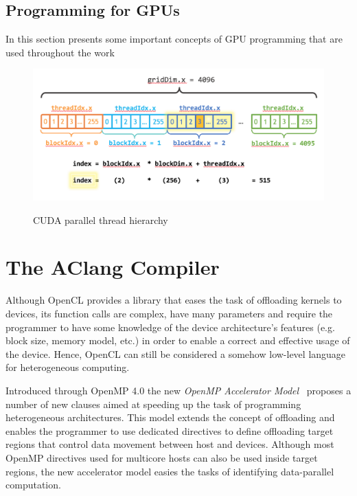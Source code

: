 \documentclass[Ingles]{ic-tese-v1}
\newcommand{\tit}[1]{{\textit{#1}}}
\begin{document}
\subsection{Programming for GPUs}

In this section presents some important concepts of GPU programming
that are used throughout the work 

\begin{figure}[t]
	\caption{CUDA parallel thread hierarchy}
	\centering
	\includegraphics[scale=0.60]{images/cuda_indexing.png}
	\label{fig:cudaindex}
\end{figure}

\section{The AClang Compiler}
\label{sec:AClang}

Although OpenCL provides  a library that eases the  task of offloading
kernels  to  devices,  its  function  calls  are  complex,  have  many
parameters and  require the programmer  to have some knowledge  of the
device architecture's  features (e.g. block size,  memory model, etc.)
in order to enable a correct and effective usage of the device. Hence,
OpenCL  can  still  be  considered a  somehow  low-level  language  for
heterogeneous computing.

Introduced  through   OpenMP  4.0  the  new   \tit{OpenMP  Accelerator
	Model}~\cite{Liao2013}  proposes a  number of  new clauses  aimed at
speeding up the task  of programming heterogeneous architectures. This
model extends the concept of  offloading and enables the programmer to
use  dedicated directives  to  define offloading  target regions  that
control data movement between host  and devices.  Although most OpenMP
directives used  for multicore  hosts can also  be used  inside target
regions, the  new accelerator  model easies  the tasks  of identifying
data-parallel computation.
\end{document}
